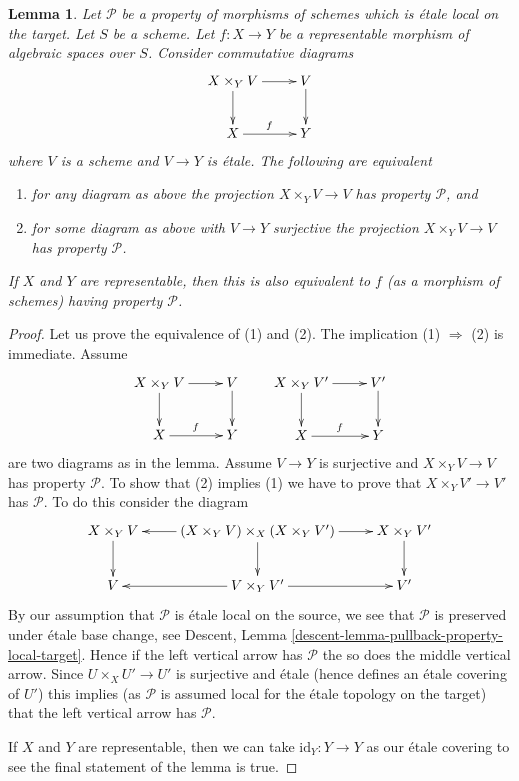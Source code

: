 \documentclass[10pt,a4paper]{amsart}
\theoremstyle{plain}
\newtheorem{lemma}[subsection]{Lemma}
\theoremstyle{definition}
\theoremstyle{remark}
\numberwithin{equation}{subsection}
\begin{document}
\begin{lemma}
\label{lemma-representable-etale-local-target}
Let $\mathcal{P}$ be a property of morphisms of schemes which is \'etale
local on the target. Let $S$ be a scheme.
Let $f : X \to Y$ be a representable morphism of algebraic spaces over $S$.
Consider commutative diagrams
$$
\xymatrix{
X \times_Y V \ar[d] \ar[r] & V \ar[d] \\
X \ar[r]^f & Y
}
$$
where $V$ is a scheme and $V \to Y$ is \'etale.
The following are equivalent
\begin{enumerate}
\item for any diagram as above the projection $X \times_Y V \to V$
has property $\mathcal{P}$, and
\item for some diagram as above with $V \to Y$ surjective
the projection $X \times_Y V \to V$ has property $\mathcal{P}$.
\end{enumerate}
If $X$ and $Y$ are representable, then this is also equivalent to
$f$ (as a morphism of schemes) having property $\mathcal{P}$.
\end{lemma}

\begin{proof}
Let us prove the equivalence of (1) and (2).
The implication (1) $\Rightarrow$ (2) is immediate.
Assume
$$
\xymatrix{
X \times_Y V \ar[d] \ar[r] & V \ar[d] \\
X \ar[r]^f & Y
}
\quad\quad
\xymatrix{
X \times_Y V' \ar[d] \ar[r] & V' \ar[d] \\
X \ar[r]^f & Y
}
$$
are two diagrams as in the lemma. Assume $V \to Y$ is
surjective and $X \times_Y V \to V$ has property $\mathcal{P}$.
To show that (2) implies (1) we have to prove that
$X \times_Y V' \to V'$ has $\mathcal{P}$. To do
this consider the diagram
$$
\xymatrix{
X \times_Y V \ar[d] &
(X \times_Y V) \times_X (X \times_Y V') \ar[l] \ar[d] \ar[r] &
X \times_Y V' \ar[d] \\
V &
V \times_Y V' \ar[l] \ar[r] &
V'
}
$$
By our assumption that $\mathcal{P}$ is \'etale local on the source,
we see that $\mathcal{P}$ is preserved under \'etale base change, see
Descent, Lemma \ref{descent-lemma-pullback-property-local-target}.
Hence if the left vertical arrow has $\mathcal{P}$ the so does
the middle vertical arrow. Since $U \times_X U' \to U'$ is surjective
and \'etale (hence defines an \'etale covering of $U'$)
this implies (as $\mathcal{P}$ is assumed local for the \'etale topology
on the target) that the left vertical arrow has $\mathcal{P}$.

\medskip\noindent
If $X$ and $Y$ are representable, then we can take
$\text{id}_Y : Y \to Y$ as our \'etale covering to see the
final statement of the lemma is true.
\end{proof}
\end{document}
